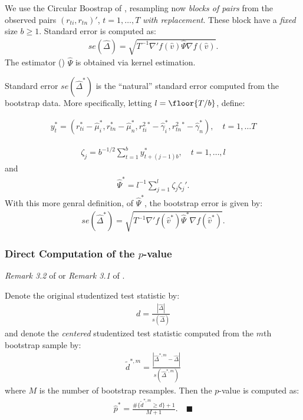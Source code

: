 \documentclass[12pt,oneside,a4paper]{article}
\begin{document}
We use the Circular Boostrap of \cite{pr92}, resampling now \textit{blocks of pairs} from the observed pairs $(r_{ti}, r_{tn})'$, $t=1, \dots, T$ \textit{with replacement}.
These block have a \textit{fixed} size $b\geq1$.
Standard error is computed as:
\begin{align*}
se(\hat{\Delta}) = \sqrt{T^{-1} \nabla'f(\hat{v}) \hat{\Psi} \nabla f(\hat{v})}.
\end{align*}
The estimator () $\hat{\Psi}$ is obtained via kernel estimation.

Standard error $se(\hat{\Delta}^{*})$ is the ``natural'' standard error computed from the bootstrap data.
More specifically, letting $l=\floor{T/b}$, define:

\begin{align}
	y_{t}^{*} = \left(  r_{ti}^{*} - \hat{\mu}_{i}^{*}, r_{tn}^{*} - \hat{\mu}_{n}^{*}, r^2_{ti}^{*} - \hat{\gamma}_{i}^{*}, r^2_{tn}^{*} - \hat{\gamma}_{n}^{*} \right), 
	\quad t=1, \dots T
\end{align}

\begin{align}
	\zeta_{j}=b^{-1/2}\sum_{t=1}^{b} y_{t+(j-1)b}^{*},
	\quad t=1,\dots,l
\end{align}
and
\begin{align}
	\hat{\Psi}^{*}=l^{-1}\sum_{j=1}^{l} \zeta_{j} \zeta_{j}'.
\end{align}
With this more genral definition, of $\hat{\Psi}^{*}$, the bootstrap error is given by:
\begin{align*}
	se(\hat{\Delta}^{*}) =
	\sqrt{T^{-1} \nabla'f(\hat{v}^{*}) \hat{\Psi}^{*} \nabla f(\hat{v}^{*})}.
\end{align*}

\subsubsection{Direct Computation of the $p$-value}
\textit{Remark 3.2} of \cite{lw2008} or \textit{Remark 3.1} of \cite{lw2018}.

Denote the original studentized test statistic by:
\begin{align}
	d = \frac{|\hat{\Delta}|}{s(\hat{\Delta})}
\end{align}
and denote the \textit{centered} studentized test statistic computed from the $m$th bootstrap sample by: %
\begin{align}
	\tilde{d}^{*, m} = \frac{|\hat{\Delta}^{*,m} - \hat{\Delta}|}{s(\hat{\Delta}^{*,m})}
\end{align}
where $M$ is the number of bootstrap resamples.
Then the $p$-value is computed as:
\begin{align}
	\hat{p}^{*} =\frac{\#\{ \tilde{d}^{*, m} \geq d\} + 1}{M+1}. 
	\quad \blacksquare
\end{align}
\end{document}
